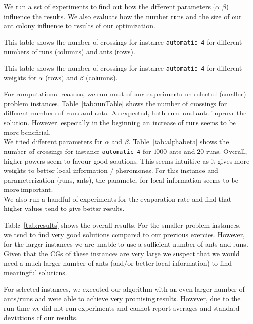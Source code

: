 \documentclass{scrartcl}
\begin{document}
We run a set of experiments to find out how the different parameters
($\alpha$ $\beta$) influence the results. We also evaluate how the
number runs and the size of our ant colony influence to results of our
optimization. \\


\begin{table}[!H]
\centering
\scriptsize  

\caption{This table shows the number of crossings for instance \texttt{automatic-4} for
different numbers of runs (columns) and ants (rows).}
\label{tab:runTable}
\end{table}


\begin{table}[!H]
\centering
\scriptsize  

\caption{This table shows the number of crossings for instance \texttt{automatic-4} for
different weights for $\alpha$ (rows) and $\beta$ (columns).}
\label{tab:alphabeta}
\end{table}


For computational reasons, we run most of our experiments on selected
(smaller) problem instances. Table~\ref{tab:runTable} shows the number
of crossings for different numbers of runs and ants. As expected, both
runs and ants improve the solution. However, especially in the
beginning an increase of runs seems to be more beneficial.\\

We tried different parameters for $\alpha$ and
$\beta$. Table~\ref{tab:alphabeta} shows the number of crossings for
instance \texttt{automatic-4} for $1000$ ants and $20$ runs.  Overall,
higher powers seem to favour good solutions. This seems intuitive as
it gives more weights to better local information / pheromones. For
this instance and parameterization (runs, ants), the parameter for
local information seems to be more important. \\

We also run a handful of experiments for the evaporation rate and find that
higher values tend to give better results.

Table~\ref{tab:results} shows the overall results. For the smaller
problem instances, we tend to find very good solutions compared to our
previous exercies. However, for the larger instances we are unable to
use a sufficient number of ants and runs. Given that the CGs of these
instances are very large we suspect that we would need a much larger
number of ants (and/or better local information) to find meaningful
solutions.

For selected instances, we executed our algorithm with an even larger
number of ants/runs and were able to achieve very promising
results. However, due to the run-time we did not run experiments and
cannot report averages and standard deviations of our results.
\end{document}
